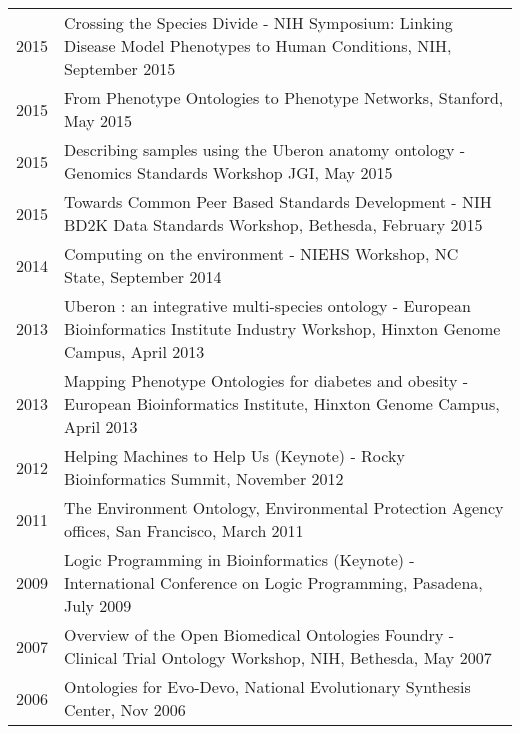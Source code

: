 \documentclass[11pt,fullpage]{article}
\begin{document}
\begin{longtable}{p{0.5in}|p{5.5in}}


 2015 & Crossing the Species Divide - NIH Symposium: Linking Disease Model Phenotypes to Human Conditions, 
  NIH, September 2015\\

 2015 & From Phenotype Ontologies to Phenotype Networks, 
  Stanford, May 2015\\

 2015 & Describing samples using the Uberon anatomy ontology - Genomics Standards Workshop
  JGI, May 2015\\

 2015 & Towards Common Peer Based Standards Development  - NIH BD2K Data Standards Workshop, 
  Bethesda, February 2015\\

 2014 & Computing on the environment - NIEHS Workshop, 
 NC State, September 2014\\

 2013 & Uberon : an integrative multi-species ontology - European Bioinformatics Institute Industry Workshop, 
 Hinxton Genome Campus, April 2013\\

 2013 & Mapping Phenotype Ontologies for diabetes and obesity - European Bioinformatics Institute, 
 Hinxton Genome Campus, April 2013\\

 2012 & Helping Machines to Help Us (Keynote) - Rocky Bioinformatics
 Summit, November 2012\\

 2011 & The Environment Ontology, Environmental Protection Agency offices, San Francisco, March 2011 \\

 2009 & Logic Programming in Bioinformatics (Keynote) - International
 Conference on Logic Programming, Pasadena, July 2009 \\

 2007 & Overview of the Open Biomedical Ontologies Foundry - Clinical Trial Ontology Workshop, NIH, Bethesda, May 2007 \\

 2006 & Ontologies for Evo-Devo, National Evolutionary Synthesis Center, Nov 2006 \\


\end{longtable}
\end{document}
